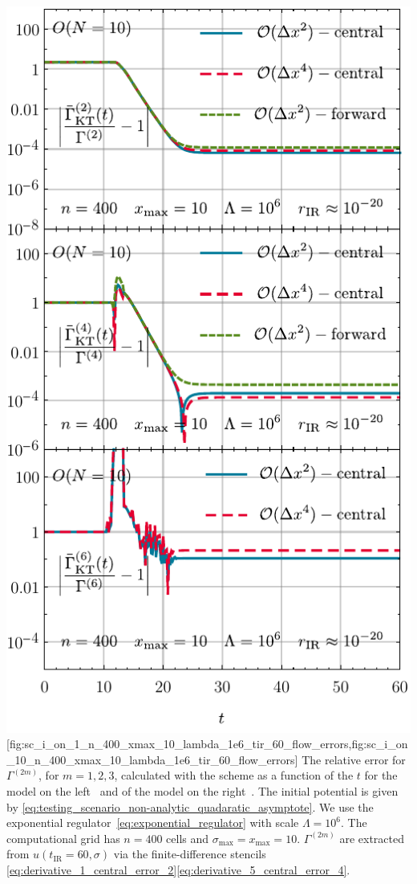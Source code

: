 	{\includegraphics[width=\subcaptionFigureWidth]{0d/figures/sc_i_on_10_n_400_xmax_10_lambda_1e6_tir_60_flow_errors.pdf}} %
	[fig:sc_i_on_1_n_400_xmax_10_lambda_1e6_tir_60_flow_errors,fig:sc_i_on_10_n_400_xmax_10_lambda_1e6_tir_60_flow_errors] %
	{%
		The relative error for $\Gamma^{(2m)}$, for $m = 1, 2, 3$, calculated with the \kt{} scheme as a function of the \rgtime{} $t$ for the  model on the left~ and of the  model on the right~.
		The \uv{} initial potential is given by \cref{eq:testing_scenario_non-analytic_quadaratic_asymptote}. 
		We use the exponential regulator~\eqref{eq:exponential_regulator} with \uv{} scale $\Lambda = 10^6$. 
		The computational grid has $n=400$ cells and $\sigma_\mathrm{max} = x_\mathrm{max} = 10$. $\Gamma^{(2m)}$ are extracted from $u ( t_\mathrm{IR} = 60, \sigma )$ via the finite-difference stencils \eqref{eq:derivative_1_central_error_2}\dash{}\eqref{eq:derivative_5_central_error_4}.
	} %
